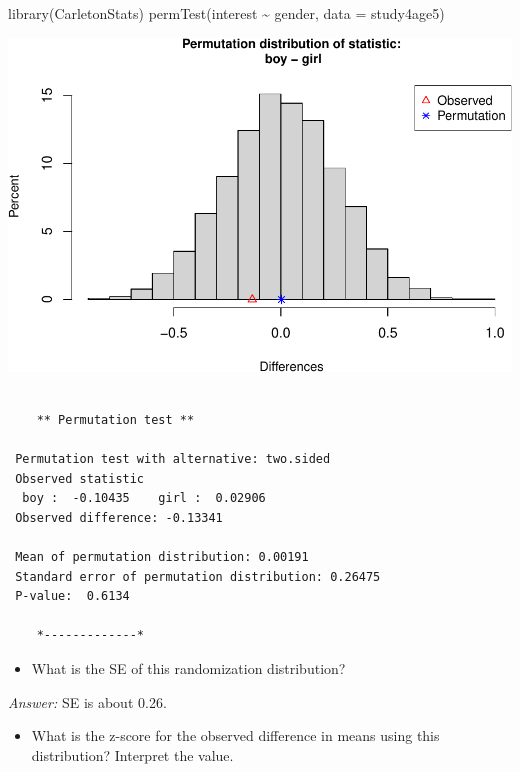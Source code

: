 \documentclass[
]{book}
\newenvironment{Shaded}{\begin{snugshade}}{\end{snugshade}}
\newcommand{\AttributeTok}[1]{\textcolor[rgb]{0.77,0.63,0.00}{#1}}
\newcommand{\FunctionTok}[1]{\textcolor[rgb]{0.00,0.00,0.00}{#1}}
\newcommand{\NormalTok}[1]{#1}
\newcommand{\SpecialCharTok}[1]{\textcolor[rgb]{0.00,0.00,0.00}{#1}}
\providecommand{\tightlist}{%
  \setlength{\itemsep}{0pt}\setlength{\parskip}{0pt}}
\begin{document}
\begin{Shaded}
\begin{Highlighting}[]
\FunctionTok{library}\NormalTok{(CarletonStats)}
\FunctionTok{permTest}\NormalTok{(interest }\SpecialCharTok{\textasciitilde{}}\NormalTok{ gender, }\AttributeTok{data =}\NormalTok{ study4age5)}
\end{Highlighting}
\end{Shaded}

\includegraphics[width=1\linewidth]{Class_Activity_14_files/figure-latex/unnamed-chunk-2-2}

\begin{verbatim}

    ** Permutation test **

 Permutation test with alternative: two.sided 
 Observed statistic
  boy :  -0.10435    girl :  0.02906 
 Observed difference: -0.13341 

 Mean of permutation distribution: 0.00191 
 Standard error of permutation distribution: 0.26475 
 P-value:  0.6134 

    *-------------*
\end{verbatim}

\begin{itemize}
\tightlist
\item
  What is the SE of this randomization distribution?
\end{itemize}

\emph{Answer:} SE is about 0.26.

\begin{itemize}
\tightlist
\item
  What is the z-score for the observed difference in means using this distribution? Interpret the value.
  \vspace*{.5in}
\end{itemize}
\end{document}
